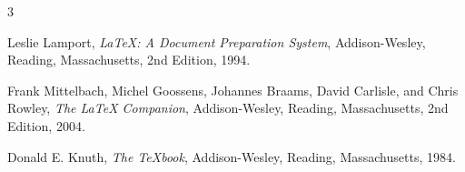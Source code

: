 \documentclass[a4j]{jarticle}
\begin{document}
\newpage
\begin{thebibliography}{3}

Leslie Lamport,
\textit{LaTeX: A Document Preparation System},
Addison-Wesley, Reading, Massachusetts, 2nd Edition, 1994.

Frank Mittelbach, Michel Goossens, Johannes Braams, David Carlisle, and Chris Rowley,
\textit{The LaTeX Companion},
Addison-Wesley, Reading, Massachusetts, 2nd Edition, 2004.

Donald E. Knuth,
\textit{The TeXbook},
Addison-Wesley, Reading, Massachusetts, 1984.

\end{thebibliography}
\end{document}

